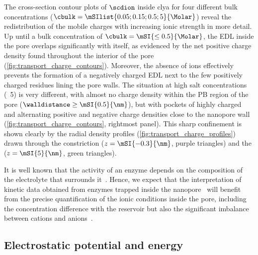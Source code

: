 The cross-section contour plots of $\scdion$ inside \gls{clya} for four different bulk concentrations ($\cbulk
= \mSIlist{0.05;0.15;0.5;5}{\Molar}$) reveal the redistribution of the mobile charges with increasing ionic
strength in more detail. Up until a bulk concentration of $\cbulk = \mSI{\le0.5}{\Molar}$, the EDL inside the
pore overlaps significantly with itself, as evidenced by the net positive charge density found throughout the
interior of the pore (\cref{fig:transport_charge_contours}). Moreover, the absence of \Cl{} ions effectively
prevents the formation of a negatively charged EDL next to the few positively charged residues lining the pore
walls. The situation at high salt concentrations (\eg~\SI{5}{\Molar}) is very different, with almost no charge
density within the PB region of the pore ($\walldistance \ge \mSI{0.5}{\nm}$), but with pockets of highly
charged and alternating positive and negative charge densities close to the nanopore wall
(\cref{fig:transport_charge_contours}, rightmost panel). This sharp confinement is shown clearly by the radial
density profiles (\cref{fig:transport_charge_profiles}) drawn through the constriction ($z = \mSI{-0.3}{\nm}$,
purple triangles) and the \lumen{} ($z = \mSI{5}{\nm}$, green triangles).

It is well known that the activity of an enzyme depends on the composition of the electrolyte that surrounds
it~\cite{Purich-2010-7}. Hence, we expect that the interpretation of kinetic data obtained from enzymes
trapped inside the nanopore~\cite{VanMeervelt-2017,Galenkamp-2018} will benefit from the precise
quantification of the ionic conditions inside the pore, including the concentration difference with the
reservoir but also the significant imbalance between cations and anions~\cite{Warren-1966}.


\subsection{Electrostatic potential and energy}\label{sect:esp}
%

